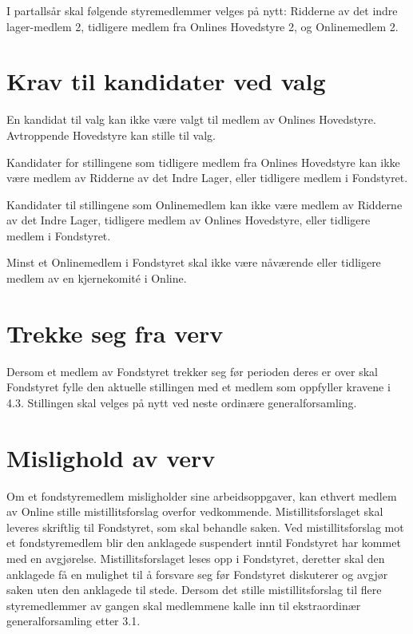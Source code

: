 I partallsår skal følgende styremedlemmer velges på nytt: Ridderne av det indre lager-medlem 2, tidligere medlem fra Onlines Hovedstyre 2, og Onlinemedlem 2.

\section{Krav til kandidater ved valg}
En kandidat til valg kan ikke være valgt til medlem av Onlines Hovedstyre. Avtroppende Hovedstyre kan stille til valg.

Kandidater for stillingene som tidligere medlem fra Onlines Hovedstyre kan ikke være medlem av Ridderne av det Indre Lager, eller tidligere medlem i Fondstyret.

Kandidater til stillingene som Onlinemedlem kan ikke være medlem av Ridderne av det Indre Lager, tidligere medlem av Onlines Hovedstyre, eller tidligere medlem i Fondstyret.

Minst et Onlinemedlem i Fondstyret skal ikke være nåværende eller tidligere medlem av en kjernekomité i Online.

\section{Trekke seg fra verv}

Dersom et medlem av Fondstyret trekker seg før perioden deres er over skal Fondstyret fylle den aktuelle stillingen med et medlem som oppfyller kravene i 4.3. Stillingen skal velges på nytt ved neste ordinære generalforsamling.

\section{Mislighold av verv}
Om et fondstyremedlem misligholder sine arbeidsoppgaver, kan ethvert medlem av Online stille mistillitsforslag overfor vedkommende. Mistillitsforslaget skal leveres skriftlig til Fondstyret, som skal behandle saken. Ved mistillitsforslag mot et fondstyremedlem blir den anklagede suspendert inntil Fondstyret har kommet med en avgjørelse. Mistillitsforslaget leses opp i Fondstyret, deretter skal den anklagede få en mulighet til å forsvare seg før Fondstyret diskuterer og avgjør saken uten den anklagede til stede. Dersom det stille mistillitsforslag til flere styremedlemmer av gangen skal medlemmene kalle inn til ekstraordinær generalforsamling etter 3.1.
